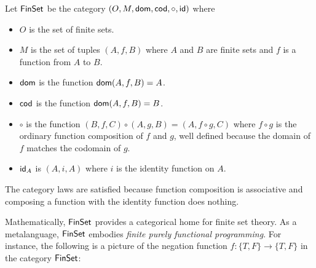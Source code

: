\begin{definition}
  \sloppy
  Let \(\mathsf{FinSet}\) be the category \((O,M,\operatorname{\mathsf{dom}},\operatorname{\mathsf{cod}},\circ,\mathsf{id})\)
  where \begin{itemize}[noitemsep]
  \item \(O\) is the set of finite
    sets.
  \item \(M\) is the set of tuples \((A,f,B)\) where \(A\) and \(B\)
    are finite sets
    and \(f\) is a function from \(A\) to \(B\).
  \item \(\operatorname{\mathsf{dom}}\) is the function \(\operatorname{\mathsf{dom}}(A,f,B) = A\).
  \item \(\operatorname{\mathsf{cod}}\) is the function \(\operatorname{\mathsf{dom}}(A,f,B) = B\).
  \item \(\circ\) is the function \((B,f,C)\circ(A,g,B) = (A,f\circ g,C)\)
    where \(f\circ g\) is the ordinary function composition of \(f\) and \(g\),
    well defined because the domain of \(f\) matches the codomain of \(g\).
  \item \(\mathsf{id}_A\) is \((A,i,A)\) where \(i\) is the identity function on \(A\).
  \end{itemize}
\end{definition}

The category laws are satisfied because function composition is associative
  and composing a function with the identity function does nothing.

Mathematically, \(\mathsf{FinSet}\) provides a categorical home for finite set theory.
As a metalanguage, \(\mathsf{FinSet}\) embodies \emph{finite purely functional programming}.
For instance,
the following is a picture of the negation function \(f : \{T,F\} \to \{T,F\}\) 
in the category \(\mathsf{FinSet}\):

\begin{center}
\end{center}

